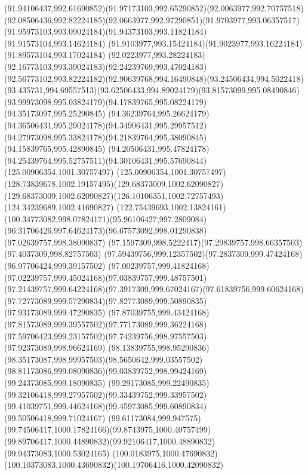 {    \curveto(91.94106437,992.61690852)(91.97173103,992.65290852)(92.0063977,992.70757518)
    \curveto(92.08506436,992.82224185)(92.0663977,992.97290851)(91.9703977,993.06357517)
    \curveto(91.95973103,993.09024184)(91.94373103,993.11824184)(91.91573104,993.14624184)
    \curveto(91.9103977,993.15424184)(91.9023977,993.16224184)(91.89573104,993.17024184)
    \curveto(92.0223977,993.28224183)(92.16773103,993.39024183)(92.24239769,993.47024183)
    \curveto(92.56773102,993.82224182)(92.90639768,994.16490848)(93.24506434,994.5022418)
    \curveto(93.435731,994.69557513)(93.62506433,994.89024179)(93.81573099,995.08490846)
    \curveto(93.99973098,995.03824179)(94.17839765,995.08224179)(94.35173097,995.25290845)
    \curveto(94.36239764,995.26624179)(94.36506431,995.29024178)(94.34906431,995.29957512)
    \curveto(94.27973098,995.33824178)(94.21839764,995.38090845)(94.15839765,995.42890845)
    \curveto(94.20506431,995.47824178)(94.25439764,995.52757511)(94.30106431,995.57690844)
    \lineto(125.00906354,1001.30757497)
    \curveto(125.00906354,1001.30757497)(128.73839678,1002.19157495)(129.68373009,1002.62090827)
    \curveto(129.68373009,1002.62090827)(126.10106351,1002.72757493)(124.34239689,1002.41690827)
    \curveto(122.75439693,1002.13824161)(100.34773082,998.07824171)(95.96106427,997.2809084)
    \curveto(96.31706426,997.64624173)(96.67573092,998.01290838)(97.02639757,998.38090837)
    \curveto(97.1597309,998.5222417)(97.29839757,998.66357503)(97.4037309,998.82757503)
    \curveto(97.59439756,999.12357502)(97.2837309,999.47424168)(96.97706424,999.39157502)
    \curveto(97.00239757,999.41824168)(97.02239757,999.45024168)(97.03839757,999.48757501)
    \curveto(97.21439757,999.64224168)(97.3917309,999.67024167)(97.61839756,999.60624168)
    \curveto(97.72773089,999.57290834)(97.82773089,999.50890835)(97.93173089,999.47290835)
    \curveto(97.87039755,999.43424168)(97.81573089,999.39557502)(97.77173089,999.36224168)
    \curveto(97.59706423,999.23157502)(97.74239756,998.97557503)(97.92373089,998.96624169)
    \curveto(98.13839755,998.95290836)(98.35173087,998.99957503)(98.5650642,999.03557502)
    \curveto(98.81173086,999.08090836)(99.03839752,998.99424169)(99.24373085,999.18090835)
    \curveto(99.29173085,999.22490835)(99.32106418,999.27957502)(99.33439752,999.33957502)
    \curveto(99.41039751,999.44624168)(99.45973085,999.60890834)(99.50506418,999.71024167)
    \curveto(99.61173084,999.947575)(99.74506417,1000.17824166)(99.8743975,1000.40757499)
    \curveto(99.89706417,1000.44890832)(99.92106417,1000.48890832)(99.94373083,1000.53024165)
    \curveto(100.0183975,1000.47690832)(100.10373083,1000.43690832)(100.19706416,1000.42090832)
}
